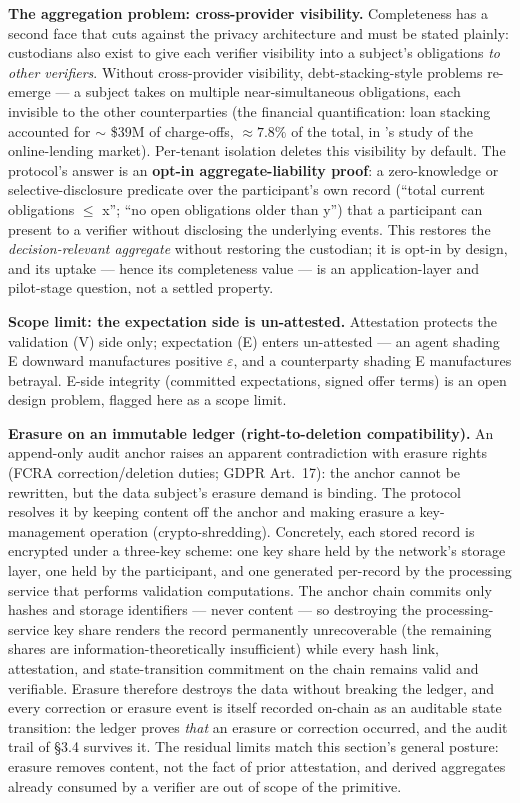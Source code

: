 \documentclass[
]{article}
\begin{document}
\textbf{The aggregation problem: cross-provider visibility.}
Completeness has a second face that cuts against the privacy
architecture and must be stated plainly: custodians also exist to give
each verifier visibility into a subject's obligations \emph{to other
verifiers}. Without cross-provider visibility, debt-stacking-style
problems re-emerge --- a subject takes on multiple near-simultaneous
obligations, each invisible to the other counterparties (the financial
quantification: loan stacking accounted for \(\sim\) \$39M of
charge-offs, \(\approx 7.8\%\) of the total, in 's study of the
online-lending market). Per-tenant isolation deletes this visibility by
default. The protocol's answer is an \textbf{opt-in aggregate-liability
proof}: a zero-knowledge or selective-disclosure predicate over the
participant's own record (``total current obligations \(\leq\) x''; ``no
open obligations older than y'') that a participant can present to a
verifier without disclosing the underlying events. This restores the
\emph{decision-relevant aggregate} without restoring the custodian; it
is opt-in by design, and its uptake --- hence its completeness value ---
is an application-layer and pilot-stage question, not a settled
property.

\textbf{Scope limit: the expectation side is un-attested.} Attestation
protects the validation (V) side only; expectation (E) enters
un-attested --- an agent shading E downward manufactures positive
\(\varepsilon\), and a counterparty shading E manufactures betrayal.
E-side integrity (committed expectations, signed offer terms) is an open
design problem, flagged here as a scope limit.

\textbf{Erasure on an immutable ledger (right-to-deletion
compatibility).} An append-only audit anchor raises an apparent
contradiction with erasure rights (FCRA correction/deletion duties; GDPR
Art.~17): the anchor cannot be rewritten, but the data subject's erasure
demand is binding. The protocol resolves it by keeping content off the
anchor and making erasure a key-management operation (crypto-shredding).
Concretely, each stored record is encrypted under a three-key scheme:
one key share held by the network's storage layer, one held by the
participant, and one generated per-record by the processing service that
performs validation computations. The anchor chain commits only hashes
and storage identifiers --- never content --- so destroying the
processing-service key share renders the record permanently
unrecoverable (the remaining shares are information-theoretically
insufficient) while every hash link, attestation, and state-transition
commitment on the chain remains valid and verifiable. Erasure therefore
destroys the data without breaking the ledger, and every correction or
erasure event is itself recorded on-chain as an auditable state
transition: the ledger proves \emph{that} an erasure or correction
occurred, and the audit trail of §3.4 survives it. The residual limits
match this section's general posture: erasure removes content, not the
fact of prior attestation, and derived aggregates already consumed by a
verifier are out of scope of the primitive.
\end{document}
